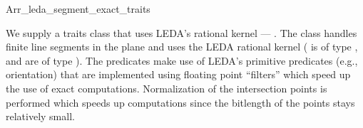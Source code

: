 
\ccRefPageBegin

\renewcommand{\ccRefPageBegin}{\begin{ccAdvanced}}
\renewcommand{\ccRefPageEnd}{\end{ccAdvanced}}
\begin{ccRefClass}{Arr_leda_segment_exact_traits}


\ccDefinition
    We supply a traits class that uses LEDA's rational kernel ---
    \ccRefName.\/ The class handles
    finite line segments in the plane
    and uses the LEDA rational kernel ( is of type 
    ,  and  are of type
    ). The predicates make use of LEDA's primitive
    predicates (e.g., orientation) that are implemented using floating point
    ``filters'' \cite{fv-sayee-96} which speed up the use of exact 
    computations.
    Normalization of the intersection points is performed which speeds up
    computations since the bitlength of the points stays relatively small.


\ccIsModel
     


\end{ccRefClass} 
\renewcommand{\ccRefPageBegin}{}
\renewcommand{\ccRefPageEnd}{}

\ccRefPageEnd
